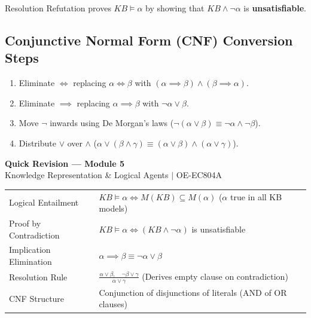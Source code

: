 \documentclass[12pt,a4paper]{article}
\renewcommand{\arraystretch}{1.45}
\begin{document}
Resolution Refutation proves $KB \models \alpha$ by showing that $KB \land \neg \alpha$ is \textbf{unsatisfiable}.

\subsection{Conjunctive Normal Form (CNF) Conversion Steps}
\begin{enumerate}[leftmargin=*, itemsep=3pt]
  \item Eliminate $\iff$ replacing $\alpha \iff \beta$ with $(\alpha \implies \beta) \land (\beta \implies \alpha)$.
  \item Eliminate $\implies$ replacing $\alpha \implies \beta$ with $\neg \alpha \lor \beta$.
  \item Move $\neg$ inwards using De Morgan's laws ($\neg(\alpha \lor \beta) \equiv \neg \alpha \land \neg \beta$).
  \item Distribute $\lor$ over $\land$ ($\alpha \lor (\beta \land \gamma) \equiv (\alpha \lor \beta) \land (\alpha \lor \gamma)$).
\end{enumerate}

\newpage
\begin{center}
  {\large\bfseries\color{myred} Quick Revision --- Module 5}\\[3pt]
  {\small\color{mydark} Knowledge Representation \& Logical Agents $|$ OE-EC804A}
\end{center}
\noindent{\color{myred}\rule{\linewidth}{1.2pt}}
\vspace{4pt}

\begin{tcolorbox}[formulabox, title={\textbf{Key Concepts and Metrics at a Glance}}]
\renewcommand{\arraystretch}{1.35}
\begin{tabularx}{\linewidth}{B{4.5cm} X}
Logical Entailment & $KB \models \alpha \iff M(KB) \subseteq M(\alpha)$ \quad ($\alpha$ true in all KB models) \\[4pt]
Proof by Contradiction & $KB \models \alpha \iff (KB \land \neg \alpha)$ is unsatisfiable \\[4pt]
Implication Elimination & $\alpha \implies \beta \equiv \neg \alpha \lor \beta$ \\[4pt]
Resolution Rule & $\frac{\alpha \lor \beta, \quad \neg \beta \lor \gamma}{\alpha \lor \gamma}$ \quad (Derives empty clause on contradiction) \\[4pt]
CNF Structure & Conjunction of disjunctions of literals (AND of OR clauses) \\
\end{tabularx}
\end{tcolorbox}
\end{document}
